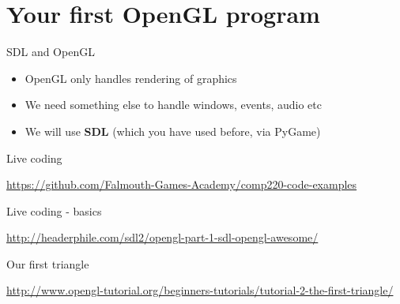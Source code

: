 \part{Your first OpenGL program}
\frame{\partpage}

\begin{frame}{SDL and OpenGL}
	\begin{itemize}
		\pause\item OpenGL only handles rendering of graphics
		\pause\item We need something else to handle windows, events, audio etc
		\pause\item We will use \textbf{SDL} (which you have used before, via PyGame)
	\end{itemize}
\end{frame}

\begin{frame}{Live coding}
	\begin{center}
		\url{https://github.com/Falmouth-Games-Academy/comp220-code-examples}
	\end{center}
\end{frame}

\begin{frame}{Live coding - basics}
	\begin{center}
		\url{http://headerphile.com/sdl2/opengl-part-1-sdl-opengl-awesome/}
	\end{center}
\end{frame}

\begin{frame}{Our first triangle}
	\begin{center}
		\url{http://www.opengl-tutorial.org/beginners-tutorials/tutorial-2-the-first-triangle/}
	\end{center}
\end{frame}

